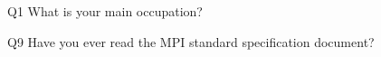 \begin{description}%
\item{Q1} What is your main occupation?%
\item{Q9} Have you ever read the MPI standard specification document?%
\end{description}%
